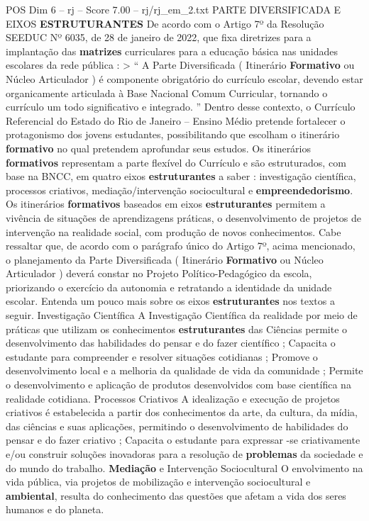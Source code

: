 \begin{textsample}{POS Dim 6 – rj – Score 7.00 – rj/rj\_em\_2.txt}  \label{ex:f6_pos_272}
PARTE DIVERSIFICADA E EIXOS \textbf{ESTRUTURANTES} De acordo com o Artigo 7º da Resolução SEEDUC Nº 6035, de 28 de janeiro de 2022, que fixa diretrizes para a implantação das \textbf{matrizes} curriculares para a educação básica nas unidades escolares da rede pública : > “ A Parte Diversificada ( Itinerário \textbf{Formativo} ou Núcleo Articulador ) é componente obrigatório do currículo escolar, devendo estar organicamente articulada à Base Nacional Comum Curricular, tornando o currículo um todo significativo e integrado. ” Dentro desse contexto, o Currículo Referencial do Estado do Rio de Janeiro – Ensino Médio pretende fortalecer o protagonismo dos jovens estudantes, possibilitando que escolham o itinerário \textbf{formativo} no qual pretendem aprofundar seus estudos.
Os itinerários \textbf{formativos} representam a parte flexível do Currículo e são estruturados, com base na BNCC, em quatro eixos \textbf{estruturantes} a saber : investigação científica, processos criativos, mediação/intervenção sociocultural e \textbf{empreendedorismo}.
Os itinerários \textbf{formativos} baseados em eixos \textbf{estruturantes} permitem a vivência de situações de aprendizagens práticas, o desenvolvimento de projetos de intervenção na realidade social, com produção de novos conhecimentos.
Cabe ressaltar que, de acordo com o parágrafo único do Artigo 7º, acima mencionado, o planejamento da Parte Diversificada ( Itinerário \textbf{Formativo} ou Núcleo Articulador ) deverá constar no Projeto Político-Pedagógico da escola, priorizando o exercício da autonomia e retratando a identidade da unidade escolar.
Entenda um pouco mais sobre os eixos \textbf{estruturantes} nos textos a seguir.
Investigação Científica A Investigação Científica da realidade por meio de práticas que utilizam os conhecimentos \textbf{estruturantes} das Ciências permite o desenvolvimento das habilidades do pensar e do fazer científico ; Capacita o estudante para compreender e resolver situações cotidianas ; Promove o desenvolvimento local e a melhoria da qualidade de vida da comunidade ; Permite o desenvolvimento e aplicação de produtos desenvolvidos com base científica na realidade cotidiana.
Processos Criativos A idealização e execução de projetos criativos é estabelecida a partir dos conhecimentos da arte, da cultura, da mídia, das ciências e suas aplicações, permitindo o desenvolvimento de habilidades do pensar e do fazer criativo ; Capacita o estudante para expressar -se criativamente e/ou construir soluções inovadoras para a resolução de \textbf{problemas} da sociedade e do mundo do trabalho. \textbf{Mediação} e Intervenção Sociocultural O envolvimento na vida pública, via projetos de mobilização e intervenção sociocultural e \textbf{ambiental}, resulta do conhecimento das questões que afetam a vida dos seres humanos e do planeta.

\end{textsample}
